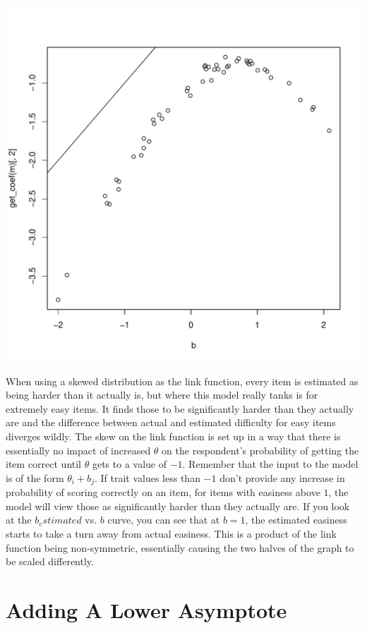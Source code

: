 \documentclass{article}\usepackage[]{graphicx}\usepackage[]{color}
\makeatletter
\def\maxwidth{ %
  \ifdim\Gin@nat@width>\linewidth
    \linewidth
  \else
    \Gin@nat@width
  \fi
}
\newenvironment{knitrout}{}{} %
\makeatother
\begin{document}
\begin{knitrout}
\includegraphics[width=\maxwidth]{figure/unnamed-chunk-8-3} 

\end{knitrout}

When using a skewed distribution as the link function, every item is estimated as being harder than it actually is, but where this model really tanks is for extremely easy items.  It finds those to be significantly harder than they actually are and the difference between actual and estimated difficulty for easy items diverges wildly.  The skew on the link function is set up in a way that there is essentially no impact of increased $\theta$ on the respondent's probability of getting the item correct until $\theta$ gets to a value of $-1$.  Remember that the input to the model is of the form $\theta_i + b_j$.  If trait values less than $-1$ don't provide any increase in probability of scoring correctly on an item, for items with easiness above $1$, the model will view those as significantly harder than they actually are.  If you look at the $b_estimated$ vs. $b$ curve, you can see that at $b =1$, the estimated easiness starts to take a turn away from actual easiness.  This is a product of the link function being non-symmetric, essentially causing the two halves of the graph to be scaled differently.

\pagebreak
\section{Adding A Lower Asymptote}
\end{document}
